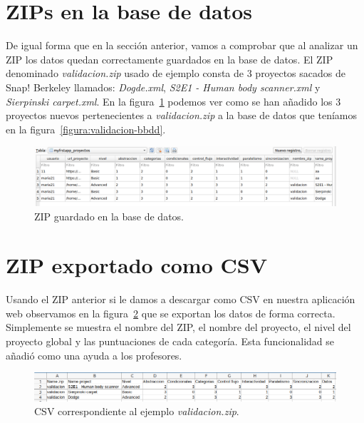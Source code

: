 \documentclass[a4paper, 12pt]{book}
\begin{document}
\section{ZIPs en la base de datos}
De igual forma que en la sección anterior, vamos a comprobar que al analizar un ZIP los datos quedan correctamente guardados en la base de datos. El ZIP denominado \textit{validacion.zip} usado de ejemplo  consta de 3 proyectos sacados de Snap! Berkeley llamados: \textit{Dogde.xml}, \textit{ S2E1 - Human body scanner.xml} y \textit{Sierpinski carpet.xml}. En la figura~\ref{figura:bbdd-zip} podemos ver como se han añadido los 3 proyectos nuevos pertenecientes a \textit{validacion.zip} a la base de datos que teníamos en la figura~\ref{figura:validacion-bbdd}.
\begin{figure}[h]
            \centering
            \includegraphics[scale=0.37]{img/bbdd-zip.png}
            \caption{ZIP guardado en la base de datos.}
             \label{figura:bbdd-zip}
        \end{figure}
\section{ZIP exportado como CSV}
Usando el ZIP anterior si le damos a descargar como CSV en nuestra aplicación web observamos en la figura~\ref{figura:csv} que se exportan los datos de forma correcta. Simplemente se muestra el nombre del ZIP, el nombre del proyecto, el nivel del proyecto global y las puntuaciones de cada categoría. Esta funcionalidad se añadió como una ayuda a los profesores.
\begin{figure}[h]
            \centering
           \includegraphics[scale=0.5]{img/csv.png}
            \caption{CSV correspondiente al ejemplo \textit{validacion.zip}.}
             \label{figura:csv}
        \end{figure}
\end{document}
